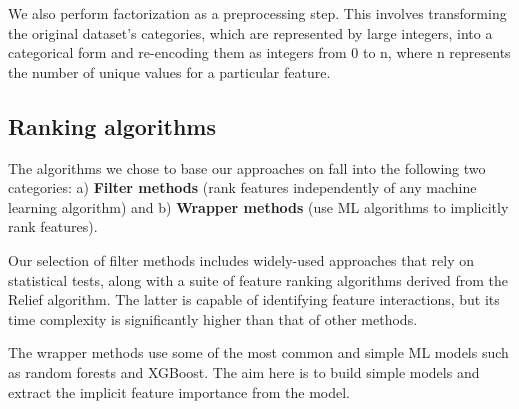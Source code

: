 \documentclass[fleqn,moreauthors,10pt]{ds_report}
\begin{document}
We also perform factorization as a preprocessing step. This involves transforming the original dataset's categories, which are represented by large integers, into a categorical form and re-encoding them as integers from 0 to n, where n represents the number of unique values for a particular feature.

\subsection*{Ranking algorithms}

The algorithms we chose to base our approaches on fall into the following two categories: a) \textbf{Filter methods} (rank features independently of any machine learning algorithm) and b) \textbf{Wrapper methods} (use ML algorithms to implicitly rank features). 



Our selection of filter methods includes widely-used approaches that rely on statistical tests, along with a suite of feature ranking algorithms derived from the Relief algorithm. The latter is capable of identifying feature interactions, but its time complexity is significantly higher than that of other methods.

The wrapper methods use some of the most common and simple ML models such as random forests and XGBoost. The aim here is to build simple models and extract the implicit feature importance from the model.


\end{document}
